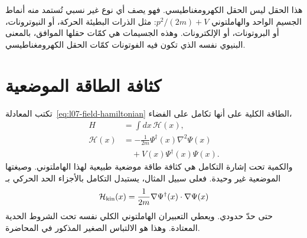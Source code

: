 هذا الحقل ليس الحقل الكهرومغناطيسي. فهو يصف أي نوع غير نسبي تُستمد منه أنماط الجسيم الواحد والهاملتوني \(p^2/(2m)+V\): مثل الذرات البطيئة الحركة، أو النيوترونات، أو البروتونات، أو الإلكترونات. وهذه الجسيمات هي كمّات حقلها الموافق، بالمعنى البنيوي نفسه الذي تكون فيه الفوتونات كمّات الحقل الكهرومغناطيسي.

\begin{classroomqa}
\end{classroomqa}

\section{كثافة الطاقة الموضعية}

تكتب المعادلة~\eqref{eq:l07-field-hamiltonian} الطاقة الكلية على أنها تكامل على الفضاء،
\begin{equation}
\begin{aligned}
H&=\int dx\,\mathcal H(x),\\
\mathcal H(x)
&=-\frac{1}{2m}\Psi^\dagger(x)\nabla^2\Psi(x)\\
&\quad+V(x)\Psi^\dagger(x)\Psi(x).
\end{aligned}
\label{eq:l07-hamiltonian-density}
\end{equation}
والكمية تحت إشارة التكامل هي كثافة طاقة موضعية طبيعية لهذا الهاملتوني. وصيغتها الموضعية غير وحيدة. فعلى سبيل المثال، يستبدل التكامل بالأجزاء الحد الحركي بـ
\begin{equation}
\mathcal H_{\rm kin}(x)
=\frac{1}{2m}\nabla\Psi^\dagger(x)\mathbin{\cdot}\nabla\Psi(x)
\label{eq:l07-kinetic-density}
\end{equation}
حتى حدّ حدودي. ويعطي التعبيران الهاملتوني الكلي نفسه تحت الشروط الحدية المعتادة. وهذا هو الالتباس الصغير المذكور في المحاضرة.

\begin{classroomqa}
\end{classroomqa}

